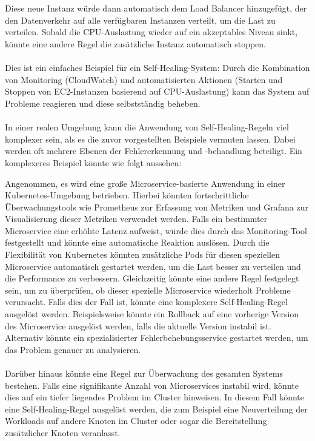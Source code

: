 \documentclass[../vs-script-first-v01.tex]{subfiles}
\begin{document}
\\\\
Diese neue Instanz würde dann automatisch dem Load Balancer hinzugefügt, der den Datenverkehr auf alle verfügbaren Instanzen verteilt, um die Last zu verteilen. Sobald die CPU-Auslastung wieder auf ein akzeptables Niveau sinkt, könnte eine andere Regel die zusätzliche Instanz automatisch stoppen.
\\\\
Dies ist ein einfaches Beispiel für ein Self-Healing-System: Durch die Kombination von Monitoring (CloudWatch) und automatisierten Aktionen (Starten und Stoppen von EC2-Instanzen basierend auf CPU-Auslastung) kann das System auf Probleme reagieren und diese selbstständig beheben.
\\\\
In einer realen Umgebung kann die Anwendung von Self-Healing-Regeln viel komplexer sein, als es die zuvor vorgestellten Beispiele vermuten lassen. Dabei werden oft mehrere Ebenen der Fehlererkennung und -behandlung beteiligt. Ein komplexeres Beispiel könnte wie folgt aussehen:

Angenommen, es wird eine große Microservice-basierte Anwendung in einer Kubernetes-Umgebung betrieben. Hierbei könnten fortschrittliche Überwachungstools wie Prometheus zur Erfassung von Metriken und Grafana zur Visualisierung dieser Metriken verwendet werden. Falls ein bestimmter Microservice eine erhöhte Latenz aufweist, würde dies durch das Monitoring-Tool festgestellt und könnte eine automatische Reaktion auslösen. Durch die Flexibilität von Kubernetes könnten zusätzliche Pods für diesen speziellen Microservice automatisch gestartet werden, um die Last besser zu verteilen und die Performance zu verbessern.
Gleichzeitig könnte eine andere Regel festgelegt sein, um zu überprüfen, ob dieser spezielle Microservice wiederholt Probleme verursacht. Falls dies der Fall ist, könnte eine komplexere Self-Healing-Regel ausgelöst werden. Beispielsweise könnte ein Rollback auf eine vorherige Version des Microservice ausgelöst werden, falls die aktuelle Version instabil ist. Alternativ könnte ein spezialisierter Fehlerbehebungsservice gestartet werden, um das Problem genauer zu analysieren.
\\\\
Darüber hinaus könnte eine Regel zur Überwachung des gesamten Systems bestehen. Falls eine signifikante Anzahl von Microservices instabil wird, könnte dies auf ein tiefer liegendes Problem im Cluster hinweisen. In diesem Fall könnte eine Self-Healing-Regel ausgelöst werden, die zum Beispiel eine Neuverteilung der Workloads auf andere Knoten im Cluster oder sogar die Bereitstellung zusätzlicher Knoten veranlasst.
\end{document}
